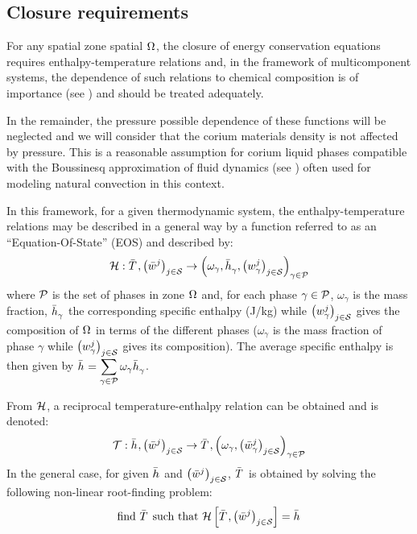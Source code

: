 \subsection{Closure requirements} \label{sect:req}

For any spatial zone spatial $\Omega_{}$, the closure of energy conservation equations requires enthalpy-temperature relations and, in the framework of multicomponent systems, the dependence of such relations to chemical composition is of importance (see \cite{Schneider1991}) and should be treated adequately. 

\begin{remark}
In the remainder, the pressure possible dependence of these functions will be neglected and we will consider that the corium materials density is not affected by pressure. This is a reasonable assumption for corium liquid phases compatible with the Boussinesq approximation of fluid dynamics (see \cite{Hills1991}) often used for modeling natural convection in this context.
\end{remark}

In this framework, for a given thermodynamic system, the enthalpy-temperature relations may be described in a general way by a function referred to as an ``Equation-Of-State'' (EOS) and described by:
\begin{equation}
 \Mc{H}: \avTemperature{}, \left(\avMassFraction[j]{}\right)_{j\in \speciesSet} \rightarrow  \left(\omega_\gamma, \avMassEnthalpy{\gamma}, \left(\massFraction[j]{\gamma}\right)_{j\in \speciesSet}\right)_{\gamma \in \phaseSet} \label{eq:eos}
\end{equation}
where $\phaseSet$ is the set of phases in zone $\Omega_{}$ and, for each phase $\gamma \in \phaseSet$, $\omega_\gamma$ is the mass fraction, $\avMassEnthalpy{\gamma}$ the corresponding specific enthalpy (J/kg) while $\left(\massFraction[j]{\gamma}\right)_{j\in \speciesSet}$ gives the composition of $\Omega_{}$ in terms of the different phases ($\omega_\gamma$ is the mass fraction of phase $\gamma$ while $\left(\massFraction[j]{\gamma}\right)_{j\in \speciesSet}$ gives its composition). The average specific enthalpy is then given by $\avMassEnthalpy{} = \displaystyle \sum_{\gamma \in \phaseSet} \omega_\gamma \avMassEnthalpy{\gamma}$.

From ${\mathcal H}$, a reciprocal temperature-enthalpy relation can be obtained and is denoted:
\begin{equation}
\Mc{T}: \avMassEnthalpy{}, \left(\avMassFraction[j]{}\right)_{j\in \speciesSet} \rightarrow \avTemperature{}, \left(\omega_\gamma, \left(\avMassFraction[j]{\gamma}\right)_{j\in \speciesSet}\right)_{\gamma \in \phaseSet}
\end{equation}
In the general case, for given $\avMassEnthalpy{}$ and $\left(\avMassFraction[j]{}\right)_{j\in \speciesSet}$, $\avTemperature{}$ is obtained by solving the following non-linear root-finding problem: 
\begin{equation}
 \text{find } \avTemperature{} \text{ such that }\Mc{H}\left[\avTemperature{}, \left(\avMassFraction[j]{}\right)_{j\in \speciesSet}\right] = \avMassEnthalpy{} \label{eq:t(h)}
\end{equation}

